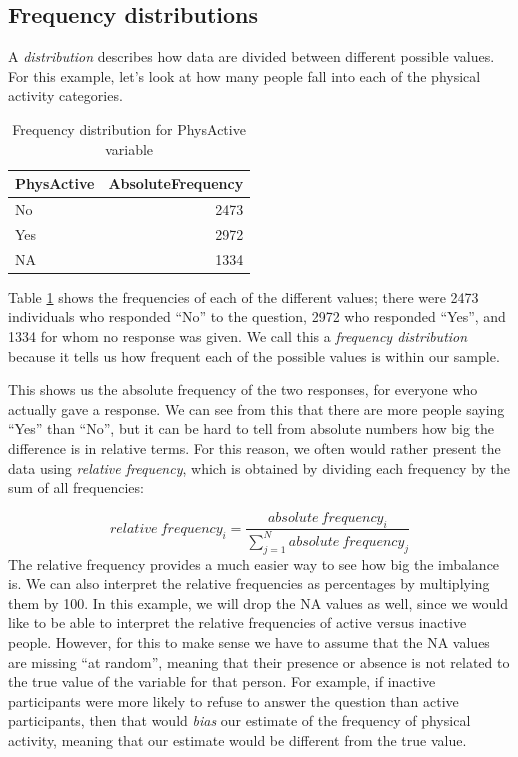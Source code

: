 \documentclass[
  12pt,
]{book}
\begin{document}
\hypertarget{frequency-distributions}{%
\subsection{Frequency distributions}\label{frequency-distributions}}

A \emph{distribution} describes how data are divided between different possible values. For this example, let's look at how many people fall into each of the physical activity categories.

\begin{table}

\caption{\label{tab:PhysActiveTable}Frequency distribution for PhysActive variable}
\centering
\begin{tabular}[t]{l|r}
\hline
PhysActive & AbsoluteFrequency\\
\hline
No & 2473\\
\hline
Yes & 2972\\
\hline
NA & 1334\\
\hline
\end{tabular}
\end{table}

Table \ref{tab:PhysActiveTable} shows the frequencies of each of the different values; there were 2473 individuals who responded ``No'' to the question, 2972 who responded ``Yes'', and 1334 for whom no response was given. We call this a \emph{frequency distribution} because it tells us how frequent each of the possible values is within our sample.

This shows us the absolute frequency of the two responses, for everyone who actually gave a response. We can see from this that there are more people saying ``Yes'' than ``No'', but it can be hard to tell from absolute numbers how big the difference is in relative terms. For this reason, we often would rather present the data using \emph{relative frequency}, which is obtained by dividing each frequency by the sum of all frequencies:

\[
relative\ frequency_i = \frac{absolute\ frequency_i}{\sum_{j=1}^N absolute\ frequency_j}
\]
The relative frequency provides a much easier way to see how big the imbalance is. We can also interpret the relative frequencies as percentages by multiplying them by 100. In this example, we will drop the NA values as well, since we would like to be able to interpret the relative frequencies of active versus inactive people. However, for this to make sense we have to assume that the NA values are missing ``at random'', meaning that their presence or absence is not related to the true value of the variable for that person. For example, if inactive participants were more likely to refuse to answer the question than active participants, then that would \emph{bias} our estimate of the frequency of physical activity, meaning that our estimate would be different from the true value.
\end{document}
